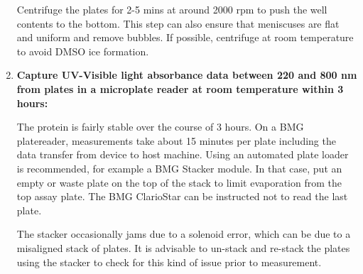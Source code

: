 \documentclass{article}
\begin{document}
\begin{enumerate}
	Centrifuge the plates for 2-5 mins at around 2000 rpm to push the well contents to the bottom.
	This step can also ensure that meniscuses are flat and uniform and remove bubbles.
	If possible, centrifuge at room temperature to avoid DMSO ice formation.

\item \textbf{Capture UV-Visible light absorbance data between 220 and 800 nm from plates in a microplate reader at room temperature within 3 hours:}

	The protein is fairly stable over the course of 3 hours.
	On a BMG platereader, measurements take about 15 minutes per plate including the data transfer from device to host machine.
	Using an automated plate loader is recommended, for example a BMG Stacker module.
	In that case, put an empty or waste plate on the top of the stack to limit evaporation from the top assay plate.
	The BMG ClarioStar can be instructed not to read the last plate.

	The stacker occasionally jams due to a solenoid error, which can be due to a misaligned stack of plates.
	It is advisable to un-stack and re-stack the plates using the stacker to check for this kind of issue prior to measurement.


\end{enumerate}
\end{document}
